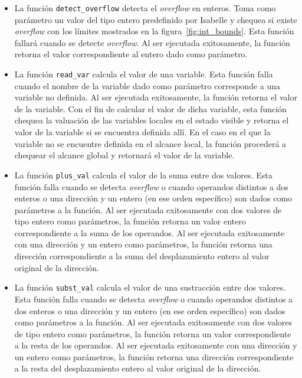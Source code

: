 \begin{itemize}
\item{La función \verb|detect_overflow| detecta el \textit{overflow} en enteros.
Toma como parámetro un valor del tipo entero predefinido por Isabelle y chequea si existe \textit{overflow} con los límites mostrados en la figura~\ref{fig:int_bounds}.
Esta función fallará cuando se detecte \textit{overflow}.
Al ser ejecutada exitosamente, la función retorna el valor correspondiente al entero dado como parámetro.}

\item{La función \verb|read_var| calcula el valor de una variable.
Esta función falla cuando el nombre de la variable dado como parámetro corresponde a una variable no definida.
Al ser ejecutada exitosamente, la función retorna el valor de la variable.
Con el fin de calcular el valor de dicha variable, esta función chequea la valuación de las variables locales en el estado visible y retorna el valor de la variable si se encuentra definida allí.
En el caso en el que la variable no se encuentre definida en el alcance local, la función procederá a chequear el alcance global y retornará el valor de la variable.}

\item{La función \verb|plus_val| calcula el valor de la suma entre dos valores.
Esta función falla cuando se detecta \textit{overflow} o cuando operandos distintos a dos enteros o una dirección y un entero (en ese orden específico) son dados como parámetros a la función.
Al ser ejecutada exitosamente con dos valores de tipo entero como parámetros, la función retorna un valor entero correspondiente a la suma de los operandos.
Al ser ejecutada exitosamente con una dirección y un entero como parámetros, la función retorna una dirección correspondiente a la suma del desplazamiento entero al valor original de la dirección.}

\item{La función \verb|subst_val| calcula el valor de una sustracción entre dos valores.
Esta función falla cuando se detecta \textit{overflow} o cuando operandos distintos a dos enteros o una dirección y un entero (en ese orden específico) son dados como parámetros a la función.
Al ser ejecutada exitosamente con dos valores de tipo entero como parámetros, la función retorna un valor correspondiente a la resta de los operandos.
Al ser ejecutada exitosamente con una dirección y un entero como parámetros, la función retorna una dirección correspondiente a la resta del desplazamiento entero al valor original de la dirección.}


\end{itemize}

